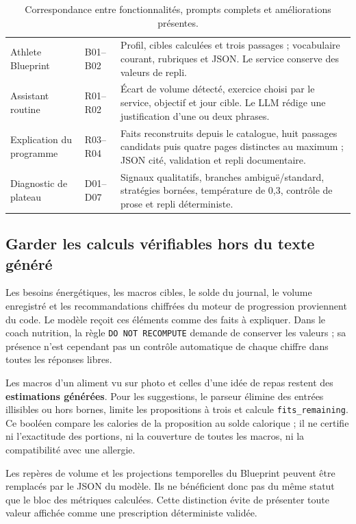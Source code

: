 \begin{table}[H]
\begin{tabularx}{\linewidth}{p{2.8cm}p{1.7cm}X}
Athlete Blueprint & B01--B02 & Profil, cibles calculées et trois passages ; vocabulaire courant, rubriques et JSON. Le service conserve des valeurs de repli. \\
Assistant routine & R01--R02 & Écart de volume détecté, exercice choisi par le service, objectif et jour cible. Le LLM rédige une justification d'une ou deux phrases. \\
Explication du programme & R03--R04 & Faits reconstruits depuis le catalogue, huit passages candidats puis quatre pages distinctes au maximum ; JSON cité, validation et repli documentaire. \\
Diagnostic de plateau & D01--D07 & Signaux qualitatifs, branches ambiguë/standard, stratégies bornées, température de 0,3, contrôle de prose et repli déterministe. \\
\bottomrule
\end{tabularx}
\caption{Correspondance entre fonctionnalités, prompts complets et améliorations présentes.}
\end{table}

\clearpage
\subsection{Garder les calculs vérifiables hors du texte généré}
Les besoins énergétiques, les macros cibles, le solde du journal, le volume enregistré et les recommandations chiffrées du moteur de progression proviennent du code. Le modèle reçoit ces éléments comme des faits à expliquer. Dans le coach nutrition, la règle \texttt{DO NOT RECOMPUTE} demande de conserver les valeurs ; sa présence n'est cependant pas un contrôle automatique de chaque chiffre dans toutes les réponses libres.

Les macros d'un aliment vu sur photo et celles d'une idée de repas restent des \textbf{estimations générées}. Pour les suggestions, le parseur élimine des entrées illisibles ou hors bornes, limite les propositions à trois et calcule \texttt{fits\_remaining}. Ce booléen compare les calories de la proposition au solde calorique ; il ne certifie ni l'exactitude des portions, ni la couverture de toutes les macros, ni la compatibilité avec une allergie.

Les repères de volume et les projections temporelles du Blueprint peuvent être remplacés par le JSON du modèle. Ils ne bénéficient donc pas du même statut que le bloc des métriques calculées. Cette distinction évite de présenter toute valeur affichée comme une prescription déterministe validée.

